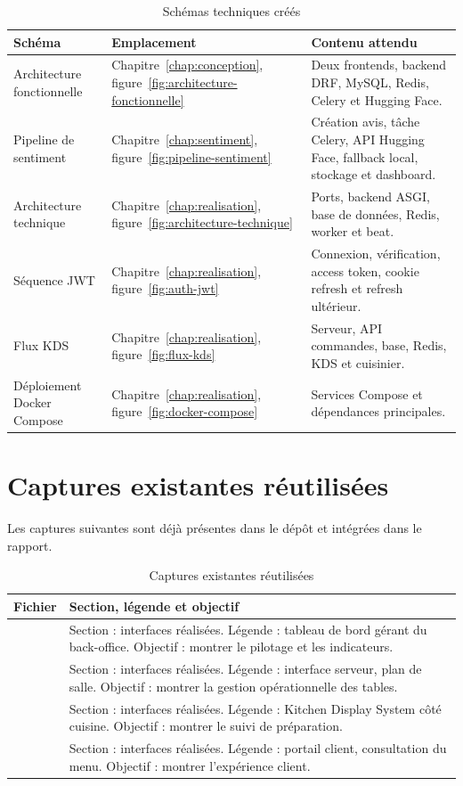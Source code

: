 \begin{table}[H]
\centering
\small
\caption{Schémas techniques créés}
\label{tab:schemas-crees}
\begin{tabularx}{\textwidth}{p{3.5cm}p{3.8cm}Y}
\toprule
\textbf{Schéma} & \textbf{Emplacement} & \textbf{Contenu attendu} \\
\midrule
Architecture fonctionnelle & Chapitre~\ref{chap:conception}, figure~\ref{fig:architecture-fonctionnelle} & Deux frontends, backend DRF, MySQL, Redis, Celery et Hugging Face. \\
Pipeline de sentiment & Chapitre~\ref{chap:sentiment}, figure~\ref{fig:pipeline-sentiment} & Création avis, tâche Celery, API Hugging Face, fallback local, stockage et dashboard. \\
Architecture technique & Chapitre~\ref{chap:realisation}, figure~\ref{fig:architecture-technique} & Ports, backend ASGI, base de données, Redis, worker et beat. \\
Séquence JWT & Chapitre~\ref{chap:realisation}, figure~\ref{fig:auth-jwt} & Connexion, vérification, access token, cookie refresh et refresh ultérieur. \\
Flux KDS & Chapitre~\ref{chap:realisation}, figure~\ref{fig:flux-kds} & Serveur, API commandes, base, Redis, KDS et cuisinier. \\
Déploiement Docker Compose & Chapitre~\ref{chap:realisation}, figure~\ref{fig:docker-compose} & Services Compose et dépendances principales. \\
\bottomrule
\end{tabularx}
\end{table}

\section{Captures existantes réutilisées}
Les captures suivantes sont déjà présentes dans le dépôt et intégrées dans le rapport.

\begin{table}[H]
\centering
\small
\caption{Captures existantes réutilisées}
\label{tab:captures-reutilisees}
\begin{tabularx}{\textwidth}{p{4cm}Y}
\toprule
\textbf{Fichier} & \textbf{Section, légende et objectif} \\
\midrule
{} & Section : interfaces réalisées. Légende : tableau de bord gérant du back-office. Objectif : montrer le pilotage et les indicateurs. \\
 & Section : interfaces réalisées. Légende : interface serveur, plan de salle. Objectif : montrer la gestion opérationnelle des tables. \\
 & Section : interfaces réalisées. Légende : Kitchen Display System côté cuisine. Objectif : montrer le suivi de préparation. \\
 & Section : interfaces réalisées. Légende : portail client, consultation du menu. Objectif : montrer l'expérience client. \\
\bottomrule
\end{tabularx}
\end{table}

